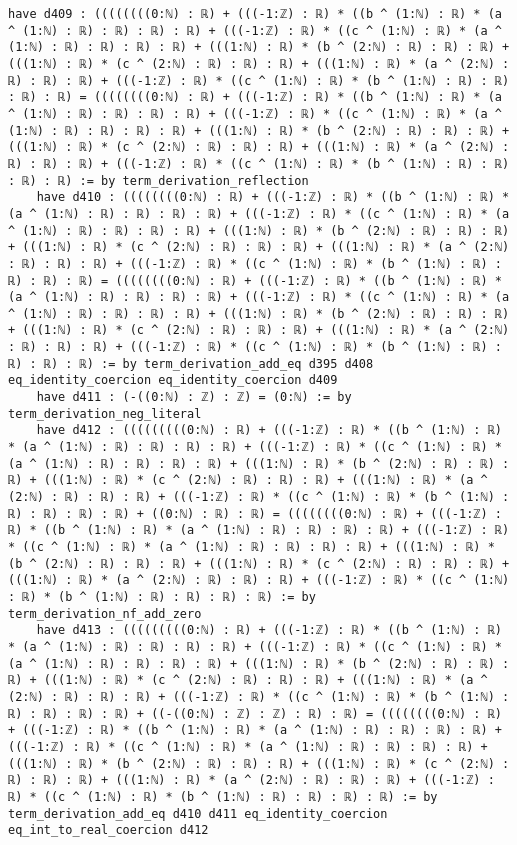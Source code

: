 \documentclass{article}
\begin{document}
\begin{tcolorbox}[colback=white!10, width=\linewidth]
\begin{lstlisting}[language=Lean4]
    have d409 : ((((((((0:ℕ) : ℝ) + (((-1:ℤ) : ℝ) * ((b ^ (1:ℕ) : ℝ) * (a ^ (1:ℕ) : ℝ) : ℝ) : ℝ) : ℝ) + (((-1:ℤ) : ℝ) * ((c ^ (1:ℕ) : ℝ) * (a ^ (1:ℕ) : ℝ) : ℝ) : ℝ) : ℝ) + (((1:ℕ) : ℝ) * (b ^ (2:ℕ) : ℝ) : ℝ) : ℝ) + (((1:ℕ) : ℝ) * (c ^ (2:ℕ) : ℝ) : ℝ) : ℝ) + (((1:ℕ) : ℝ) * (a ^ (2:ℕ) : ℝ) : ℝ) : ℝ) + (((-1:ℤ) : ℝ) * ((c ^ (1:ℕ) : ℝ) * (b ^ (1:ℕ) : ℝ) : ℝ) : ℝ) : ℝ) = ((((((((0:ℕ) : ℝ) + (((-1:ℤ) : ℝ) * ((b ^ (1:ℕ) : ℝ) * (a ^ (1:ℕ) : ℝ) : ℝ) : ℝ) : ℝ) + (((-1:ℤ) : ℝ) * ((c ^ (1:ℕ) : ℝ) * (a ^ (1:ℕ) : ℝ) : ℝ) : ℝ) : ℝ) + (((1:ℕ) : ℝ) * (b ^ (2:ℕ) : ℝ) : ℝ) : ℝ) + (((1:ℕ) : ℝ) * (c ^ (2:ℕ) : ℝ) : ℝ) : ℝ) + (((1:ℕ) : ℝ) * (a ^ (2:ℕ) : ℝ) : ℝ) : ℝ) + (((-1:ℤ) : ℝ) * ((c ^ (1:ℕ) : ℝ) * (b ^ (1:ℕ) : ℝ) : ℝ) : ℝ) : ℝ) := by term_derivation_reflection
    have d410 : ((((((((0:ℕ) : ℝ) + (((-1:ℤ) : ℝ) * ((b ^ (1:ℕ) : ℝ) * (a ^ (1:ℕ) : ℝ) : ℝ) : ℝ) : ℝ) + (((-1:ℤ) : ℝ) * ((c ^ (1:ℕ) : ℝ) * (a ^ (1:ℕ) : ℝ) : ℝ) : ℝ) : ℝ) + (((1:ℕ) : ℝ) * (b ^ (2:ℕ) : ℝ) : ℝ) : ℝ) + (((1:ℕ) : ℝ) * (c ^ (2:ℕ) : ℝ) : ℝ) : ℝ) + (((1:ℕ) : ℝ) * (a ^ (2:ℕ) : ℝ) : ℝ) : ℝ) + (((-1:ℤ) : ℝ) * ((c ^ (1:ℕ) : ℝ) * (b ^ (1:ℕ) : ℝ) : ℝ) : ℝ) : ℝ) = ((((((((0:ℕ) : ℝ) + (((-1:ℤ) : ℝ) * ((b ^ (1:ℕ) : ℝ) * (a ^ (1:ℕ) : ℝ) : ℝ) : ℝ) : ℝ) + (((-1:ℤ) : ℝ) * ((c ^ (1:ℕ) : ℝ) * (a ^ (1:ℕ) : ℝ) : ℝ) : ℝ) : ℝ) + (((1:ℕ) : ℝ) * (b ^ (2:ℕ) : ℝ) : ℝ) : ℝ) + (((1:ℕ) : ℝ) * (c ^ (2:ℕ) : ℝ) : ℝ) : ℝ) + (((1:ℕ) : ℝ) * (a ^ (2:ℕ) : ℝ) : ℝ) : ℝ) + (((-1:ℤ) : ℝ) * ((c ^ (1:ℕ) : ℝ) * (b ^ (1:ℕ) : ℝ) : ℝ) : ℝ) : ℝ) := by term_derivation_add_eq d395 d408 eq_identity_coercion eq_identity_coercion d409
    have d411 : (-((0:ℕ) : ℤ) : ℤ) = (0:ℕ) := by term_derivation_neg_literal
    have d412 : (((((((((0:ℕ) : ℝ) + (((-1:ℤ) : ℝ) * ((b ^ (1:ℕ) : ℝ) * (a ^ (1:ℕ) : ℝ) : ℝ) : ℝ) : ℝ) + (((-1:ℤ) : ℝ) * ((c ^ (1:ℕ) : ℝ) * (a ^ (1:ℕ) : ℝ) : ℝ) : ℝ) : ℝ) + (((1:ℕ) : ℝ) * (b ^ (2:ℕ) : ℝ) : ℝ) : ℝ) + (((1:ℕ) : ℝ) * (c ^ (2:ℕ) : ℝ) : ℝ) : ℝ) + (((1:ℕ) : ℝ) * (a ^ (2:ℕ) : ℝ) : ℝ) : ℝ) + (((-1:ℤ) : ℝ) * ((c ^ (1:ℕ) : ℝ) * (b ^ (1:ℕ) : ℝ) : ℝ) : ℝ) : ℝ) + ((0:ℕ) : ℝ) : ℝ) = ((((((((0:ℕ) : ℝ) + (((-1:ℤ) : ℝ) * ((b ^ (1:ℕ) : ℝ) * (a ^ (1:ℕ) : ℝ) : ℝ) : ℝ) : ℝ) + (((-1:ℤ) : ℝ) * ((c ^ (1:ℕ) : ℝ) * (a ^ (1:ℕ) : ℝ) : ℝ) : ℝ) : ℝ) + (((1:ℕ) : ℝ) * (b ^ (2:ℕ) : ℝ) : ℝ) : ℝ) + (((1:ℕ) : ℝ) * (c ^ (2:ℕ) : ℝ) : ℝ) : ℝ) + (((1:ℕ) : ℝ) * (a ^ (2:ℕ) : ℝ) : ℝ) : ℝ) + (((-1:ℤ) : ℝ) * ((c ^ (1:ℕ) : ℝ) * (b ^ (1:ℕ) : ℝ) : ℝ) : ℝ) : ℝ) := by term_derivation_nf_add_zero
    have d413 : (((((((((0:ℕ) : ℝ) + (((-1:ℤ) : ℝ) * ((b ^ (1:ℕ) : ℝ) * (a ^ (1:ℕ) : ℝ) : ℝ) : ℝ) : ℝ) + (((-1:ℤ) : ℝ) * ((c ^ (1:ℕ) : ℝ) * (a ^ (1:ℕ) : ℝ) : ℝ) : ℝ) : ℝ) + (((1:ℕ) : ℝ) * (b ^ (2:ℕ) : ℝ) : ℝ) : ℝ) + (((1:ℕ) : ℝ) * (c ^ (2:ℕ) : ℝ) : ℝ) : ℝ) + (((1:ℕ) : ℝ) * (a ^ (2:ℕ) : ℝ) : ℝ) : ℝ) + (((-1:ℤ) : ℝ) * ((c ^ (1:ℕ) : ℝ) * (b ^ (1:ℕ) : ℝ) : ℝ) : ℝ) : ℝ) + ((-((0:ℕ) : ℤ) : ℤ) : ℝ) : ℝ) = ((((((((0:ℕ) : ℝ) + (((-1:ℤ) : ℝ) * ((b ^ (1:ℕ) : ℝ) * (a ^ (1:ℕ) : ℝ) : ℝ) : ℝ) : ℝ) + (((-1:ℤ) : ℝ) * ((c ^ (1:ℕ) : ℝ) * (a ^ (1:ℕ) : ℝ) : ℝ) : ℝ) : ℝ) + (((1:ℕ) : ℝ) * (b ^ (2:ℕ) : ℝ) : ℝ) : ℝ) + (((1:ℕ) : ℝ) * (c ^ (2:ℕ) : ℝ) : ℝ) : ℝ) + (((1:ℕ) : ℝ) * (a ^ (2:ℕ) : ℝ) : ℝ) : ℝ) + (((-1:ℤ) : ℝ) * ((c ^ (1:ℕ) : ℝ) * (b ^ (1:ℕ) : ℝ) : ℝ) : ℝ) : ℝ) := by term_derivation_add_eq d410 d411 eq_identity_coercion eq_int_to_real_coercion d412

\end{lstlisting}
\end{tcolorbox}
\end{document}
